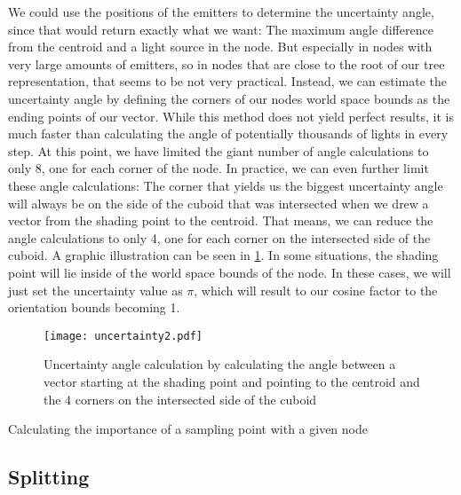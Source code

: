We could use the positions of the emitters to determine the uncertainty angle, since that would return exactly what we want: The maximum angle difference from the centroid and a light source in the node. But especially in nodes with very large amounts of emitters, so in nodes that are close to the root of our tree representation, that seems to be not very practical. Instead, we can estimate the uncertainty angle by defining the corners of our nodes world space bounds as the ending points of our vector. While this method does not yield perfect results, it is much faster than calculating the angle of potentially thousands of lights in every step. At this point, we have limited the giant number of angle calculations to only 8, one for each corner of the node. In practice, we can even further limit these angle calculations: The corner that yields us the biggest uncertainty angle will always be on the side of the cuboid that was intersected when we drew a vector from the shading point to the centroid. That means, we can reduce the angle calculations to only 4, one for each corner on the intersected side of the cuboid. A graphic illustration can be seen in \ref{fig:uncertainty2}. In some situations, the shading point will lie inside of the world space bounds of the node. In these cases, we will just set the uncertainty value as $\pi$, which will result to our cosine factor to the orientation bounds becoming 1.

\begin{figure}
	\begin{center}
		\texttt{[image: uncertainty2.pdf]}
		\caption{Uncertainty angle calculation by calculating the angle between a vector starting at the shading point and pointing to the centroid and the 4 corners on the intersected side of the cuboid}
		\label{fig:uncertainty2}
	\end{center}
\end{figure}


\begin{algorithm}
	\caption{Calculating the importance of a sampling point with a given node}
	\label{alg:imp}
	\begin{algorithmic}[1] %
		\EndProcedure
	\end{algorithmic}
\end{algorithm}

\subsection{Splitting}
\label{subs:split}